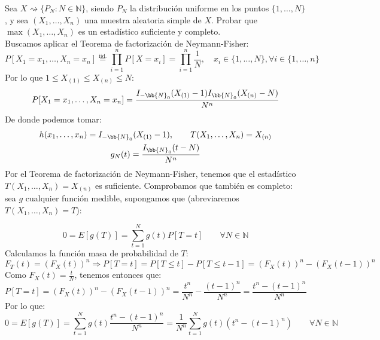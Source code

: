 \begin{ejercicio}
    Sea $X\rightsquigarrow\{P_N : N\in \mathbb{N}\}$, siendo $P_N$ la distribución uniforme en los puntos $\{1,\ldots,N\}$, y sea $(X_1, \ldots, X_n)$ una muestra aleatoria simple de $X$. Probar que $\max(X_1, \ldots, X_n)$ es un estadístico suficiente y completo.\\

    \noindent
    Buscamos aplicar el Teorema de factorización de Neymann-Fisher:
    \begin{equation*}
        P[X_1 = x_1, \ldots, X_n = x_n] \stackrel{\text{iid.}}{=} \prod_{i=1}^{n}P[X=x_i] =  \prod_{i=1}^{n} \dfrac{1}{N}, \quad x_i \in \{1,\ldots, N\}, \forall i \in \{1,\ldots,n\}
    \end{equation*}
    Por lo que $1\leq X_{(1)} \leq X_{(n)} \leq N$:
    \begin{equation*}
        P[X_1 = x_1, \ldots, X_n=x_n] = \dfrac{I_{-\bb{N}_0}(X_{(1)}-1)I_{\bb{N}_0}(X_{(n)}-N)}{N^n}
    \end{equation*}
    De donde podemos tomar:
    \begin{gather*}
        h(x_1, \ldots, x_n) = I_{-\bb{N}_0}(X_{(1)}-1), \qquad T(X_1, \ldots, X_n) = X_{(n)} \\ 
        g_N(t) = \dfrac{I_{\bb{N}_0}(t-N)}{N^n}
    \end{gather*}
    Por el Teorema de factorización de Neymann-Fisher, tenemos que el estadístico $T(X_1, \ldots, X_n) = X_{(n)}$ es suficiente. Comprobamos que también es completo: sea $g$ cualquier función medible, supongamos que (abreviaremos $T(X_1, \ldots, X_n) = T$):

    \begin{equation*}
        0 = E[g(T)] = \sum_{t=1}^{N}g(t)P[T=t] \qquad \forall N\in \mathbb{N}
    \end{equation*}
    Calculamos la función masa de probabilidad de $T$:
    \begin{equation*}
        F_T(t) = {(F_X(t))}^{n} \Longrightarrow P[T=t] = P[T\leq t] - P[T\leq t-1] = {(F_X(t))}^{n} - {(F_X(t-1))}^{n}
    \end{equation*}
    Como $F_X(t) = \frac{t}{N}$, tenemos entonces que:
    \begin{equation*}
        P[T=t] = {(F_X(t))}^{n} - {(F_X(t-1))}^{n} = \dfrac{t^n}{N^n} - \dfrac{{(t-1)}^{n}}{N^n} = \dfrac{t^n - {(t-1)}^{n}}{N^n}
    \end{equation*}
    Por lo que:
    \begin{equation*}
        0 = E[g(T)] = \sum_{t=1}^{N} g(t) \dfrac{t^n -{(t-1)}^{n}}{N^n} = \dfrac{1}{N^n} \sum_{t=1}^{N} g(t) (t^n - {(t-1)}^{n}) \qquad \forall N\in \mathbb{N}
    \end{equation*}


\end{ejercicio}

